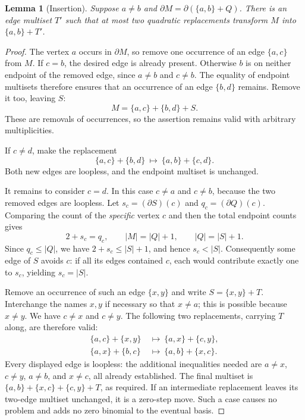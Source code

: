 \documentclass[11pt,letterpaper]{article}
\newtheorem{lemma}[theorem]{Lemma}
\newcommand{\dd}{\partial}
\newcommand{\ee}[2]{\{#1,#2\}}
\begin{document}
\begin{lemma}[Insertion]
Suppose $a\ne b$ and $\dd M=\dd(\ee{a}{b}+Q)$. There is an edge multiset
$T'$ such that at most two quadratic replacements transform $M$ into
$\ee{a}{b}+T'$.
\end{lemma}
\begin{proof}
The vertex $a$ occurs in $\dd M$, so remove one occurrence of an edge
$\ee{a}{c}$ from $M$. If $c=b$, the desired edge is already present.
Otherwise $b$ is on neither endpoint of the removed edge, since $a\ne b$
and $c\ne b$. The equality of endpoint multisets therefore ensures that
an occurrence of an edge $\ee{b}{d}$ remains. Remove it too, leaving $S$:
\[
 M=\ee{a}{c}+\ee{b}{d}+S.
\]
These are removals of occurrences, so the assertion remains valid with
arbitrary multiplicities.

If $c\ne d$, make the replacement
\[
 \ee{a}{c}+\ee{b}{d}\ \longmapsto\ \ee{a}{b}+\ee{c}{d}.
\]
Both new edges are loopless, and the endpoint multiset is unchanged.

It remains to consider $c=d$. In this case $c\ne a$ and $c\ne b$, because
the two removed edges are loopless. Let $s_c=(\dd S)(c)$ and
$q_c=(\dd Q)(c)$. Comparing the count of the \emph{specific} vertex $c$
and then the total endpoint counts gives
\[
 2+s_c=q_c,\qquad |M|=|Q|+1,\qquad |Q|=|S|+1.
\]
Since $q_c\leq |Q|$, we have
$2+s_c\leq |S|+1$, and hence $s_c<|S|$. Consequently some edge of $S$
avoids $c$: if all its edges contained $c$, each would contribute exactly
one to $s_c$, yielding $s_c=|S|$.

Remove an occurrence of such an edge $\ee{x}{y}$ and write
$S=\ee{x}{y}+T$. Interchange the names $x,y$ if necessary so that $x\ne a$;
this is possible because $x\ne y$. We have $c\ne x$ and $c\ne y$.
The following two replacements, carrying $T$ along, are therefore valid:
\begin{align*}
 \ee{a}{c}+\ee{x}{y}&\ \longmapsto\ \ee{a}{x}+\ee{c}{y},\\
 \ee{a}{x}+\ee{b}{c}&\ \longmapsto\ \ee{a}{b}+\ee{x}{c}.
\end{align*}
Every displayed edge is loopless: the additional inequalities needed are
$a\ne x$, $c\ne y$, $a\ne b$, and $x\ne c$, all already established.
The final multiset is
$\ee{a}{b}+\ee{x}{c}+\ee{c}{y}+T$, as required.
If an intermediate replacement leaves its two-edge multiset unchanged,
it is a zero-step move. Such a case causes no problem and adds no zero
binomial to the eventual basis.
\end{proof}
\end{document}
